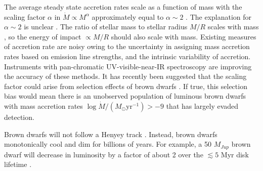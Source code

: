 The average steady state accretion rates scale as a function of mass with the scaling factor $\alpha$ in $\dot{M}\propto M^\alpha$ approximately equal to $\alpha \sim 2$ \citep{2008A&A...481..423G,2006ApJ...639L..83A,2006A&A...452..245N,2009ApJ...696.1589H}.  The explanation for $\alpha \sim 2$ is unclear \citep{2006ApJ...648..484H}.  The ratio of stellar mass to stellar radius $M/R$ scales with mass \citep{2009AIPC.1094..102C}, so the energy of impact $\propto M/R$ should also scale with mass.  Existing measures of accretion rate are noisy owing to the uncertainty in assigning mass accretion rates based on emission line strengths, and the intrinsic variability of accretion.  Instruments with pan-chromatic UV-visible-near-IR spectroscopy \citep{2011A&A...536A.105V,2012A&A...548A..56R} are improving the accuracy of these methods.  It has recently been suggested that the scaling factor could arise from selection effects of brown dwarfs \citep{2010MNRAS.409.1307M}.  If true, this selection bias would mean there is an unobserved population of luminous brown dwarfs with mass accretion rates $\log{\dot{M}/(M_{\odot}\mathrm{yr}^{-1})} >-9$ that has largely evaded detection.

Brown dwarfs will not follow a Henyey track \citep{1959ApJ...129....2H}.  Instead, brown dwarfs monotonically cool and dim for billions of years.  For example, a 50 $M_{Jup}$ brown dwarf will decrease in luminosity by a factor of about 2 over the $\lesssim5$ Myr disk lifetime \citep{2002A&A...382..563B}.

